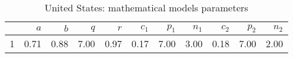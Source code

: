 \begin{table}[H]
\centering
\begin{tabular}{rrrrrrrrrrr}
  \hline
 & $a$ & $b$ & $q$ & $r$ & $c_1$ & $p_1$ & $n_1$ & $c_2$ & $p_2$ & $n_2$ \\ 
  \hline
1 & 0.71 & 0.88 & 7.00 & 0.97 & 0.17 & 7.00 & 3.00 & 0.18 & 7.00 & 2.00 \\ 
   \hline
\end{tabular}
\caption{United States: mathematical models parameters} 
\label{fig:United Statesmathmodelpars}
\end{table}
